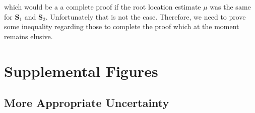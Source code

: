  which would be a a complete proof if the root location estimate $\mu$ was the same for $\mathbf{S}_1$ and $\mathbf{S}_2$. Unfortunately that is not the case. Therefore, we need to prove some inequality regarding those to complete the proof which at the moment remains elusive.   

\section{Supplemental Figures}
\label{appendix:SupplementalFigures}

\subsection{More Appropriate Uncertainty}

